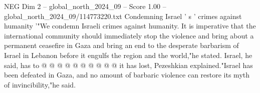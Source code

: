 \begin{textsample}{NEG Dim 2 – global\_north\_2024\_09 – Score 1.00 – global\_north\_2024\_09/114773220.txt}
Condemning Israel ' s ' crimes against humanity '"We condemn Israeli crimes against humanity.
It is imperative that the international community should immediately stop the violence and bring about a permanent ceasefire in Gaza and bring an end to the desperate barbarism of Israel in Lebanon before it engulfs the region and the world,"he stated.
Israel, he said, has to @ @ @ @ @ @ @ @ @ @ it has lost, Pezeshkian explained."Israel has been defeated in Gaza, and no amount of barbaric violence can restore its myth of invincibility,"he said.

\end{textsample}
